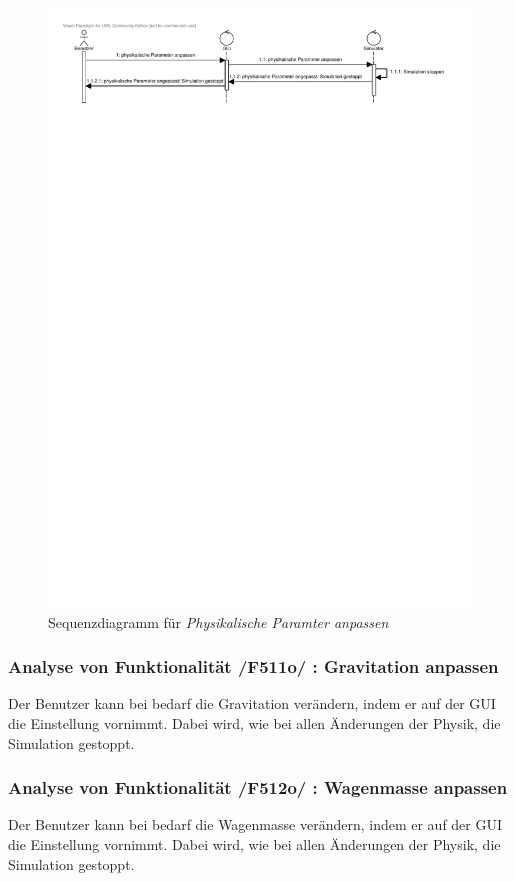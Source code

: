 \begin{figure}
\includegraphics[viewport = 0 25cm 20cm 30cm,width=\linewidth]{bilder/PhysikalischeParameter.pdf}
\caption{Sequenzdiagramm für \textit{Physikalische Paramter anpassen}}
\end{figure}

\subsubsection{Analyse von Funktionalität /F511o/ :  Gravitation anpassen}
Der Benutzer kann bei bedarf die Gravitation verändern, indem er auf der GUI die Einstellung vornimmt. Dabei wird, wie bei allen Änderungen der Physik, die Simulation gestoppt.
\subsubsection{Analyse von Funktionalität /F512o/ :  Wagenmasse anpassen}
Der Benutzer kann bei bedarf die Wagenmasse verändern, indem er auf der GUI die Einstellung vornimmt. Dabei wird, wie bei allen Änderungen der Physik, die Simulation gestoppt.

